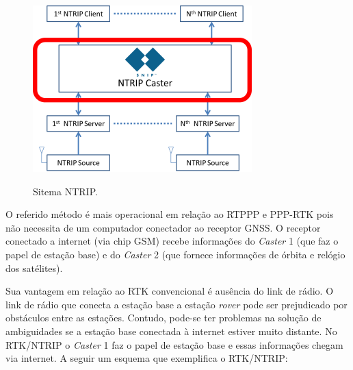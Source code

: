 \begin{figure}[!htb]
\centering
\includegraphics[scale=2.0]{img/nnnnnnn.png} %
\caption{Sitema NTRIP.} \citep{snip}
\label{Rotulo}
\end{figure}


O referido método é mais operacional em relação ao RTPPP e PPP-RTK pois não necessita de um computador conectador ao receptor GNSS. O receptor conectado a internet (via chip GSM) recebe informações do \textit{Caster} 1 (que faz o papel de estação base) e do \textit{Caster} 2 (que fornece informações de órbita e relógio dos satélites).

Sua vantagem em relação ao RTK convencional é ausência do link de rádio. O link de rádio que conecta a estação base a estação \textit{rover} pode ser prejudicado por obstáculos entre as estações. Contudo, pode-se ter problemas na solução de ambiguidades se a estação base conectada à internet estiver muito distante. No RTK/NTRIP o \textit{Caster} 1 faz o papel de estação base e essas informações chegam via internet. A seguir um esquema que exemplifica o RTK/NTRIP:

